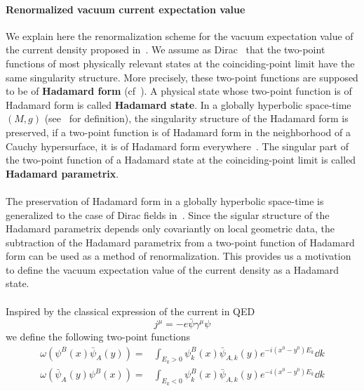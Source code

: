 \paragraph{Renormalized vacuum current expectation value}
We explain here the renormalization scheme for the vacuum expectation value of the current density proposed in~\cite{Zahn2015}.
We assume as Dirac~\cite{Dirac1934} that the two-point functions of most physically relevant states at the coinciding-point limit have the same singularity structure.
More precisely, these two-point functions are supposed to be of \textbf{Hadamard form} (cf~\cite{Hollands2014}).
A physical state whose two-point function is of Hadamard form is called \textbf{Hadamard state}.
In a globally hyperbolic space-time $(M,g)$ (see~\cite{Wald2010} for definition), 
the singularity structure of the Hadamard form is preserved, 
\ie if a two-point function is of Hadamard form in the neighborhood of a Cauchy hypersurface, it is of Hadamard form everywhere~\cite{Fulling1978}.
The singular part of the two-point function of a Hadamard state at the coinciding-point limit is called \textbf{Hadamard parametrix}.  \\\\
%
The preservation of Hadamard form in a globally hyperbolic space-time is generalized to the case of Dirac fields in~\cite{Sahlmann2000}.
Since the sigular structure of the Hadamard parametrix depends only covariantly on local geometric data, the subtraction of the Hadamard parametrix from a two-point function of Hadamard form can be used as a method of renormalization.
This provides us a motivation to define the vacuum expectation value of the current density as a Hadamard state.
\\\\
Inspired by the classical expression of the current in QED
\begin{equation*}
j^\mu = -e\bar{\psi}\gamma^\mu\psi
\end{equation*}
we define the following two-point functions
\begin{equation}\label{vacuum-hadamardstate}
\begin{split}
\omega(\psi^B(x)\bar{\psi}_A(y)) = & \int_{E_k >0} \psi_k^B(x)\bar{\psi}_{A,k}(y)e^{-i(x^0-y^0)E_k} \dd k \\
\omega(\bar{\psi}_A(y)\psi^B(x)) = & \int_{E_k <0} \psi_k^B(x)\bar{\psi}_{A,k}(y)e^{-i(x^0-y^0)E_k} \dd k 
\end{split}
\end{equation}
